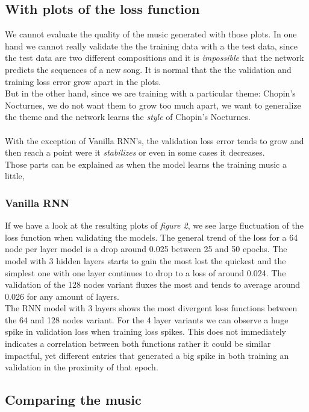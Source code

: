 \documentclass[11pt]
{article}
\begin{document}
\subsection{With plots of the loss function}
We cannot evaluate the quality of the music generated with those plots.
In one hand we cannot really validate the the training data with a the test data, since the test data are two different compositions and it is \textit{impossible} that the network predicts the sequences of a new song.
It is normal that the the validation and training loss error grow apart in the plots.\\
But in the other hand, since we are training with a particular theme: Chopin's Nocturnes, we do not want them to grow too much apart, we want to generalize the theme and the network learns the \textit{style} of Chopin's Nocturnes.\\
\\

With the exception of Vanilla RNN's, the validation loss error tends to grow and then reach a point were it \textit{stabilizes} or even in some cases it decreases.\\
Those parts can be explained as when the model learns the training music a little, 



\subsubsection{Vanilla RNN}
If we have a look at the resulting plots of \textit{figure 2}, we see large fluctuation of the loss function when validating the models. The general trend of the loss for a 64 node per layer model is a drop around 0.025 between 25 and 50 epochs. The model with 3 hidden layers starts to gain the most lost the quickest and the simplest one with one layer continues to drop to a loss of around 0.024. The validation of the 128 nodes variant  fluxes the most and tends to average around 0.026 for any amount of layers.
\\
The RNN model with 3 layers shows the most divergent loss functions between the 64 and 128 nodes variant. For the 4 layer variants we can observe a huge spike in validation loss when training loss spikes. This does not immediately indicates a correlation between both functions rather it could be similar impactful, yet different entries that generated a big spike in both training an validation in the proximity of that epoch.

\subsection{Comparing the music}
\end{document}
